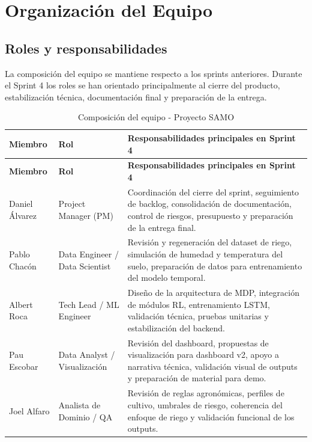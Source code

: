 \documentclass[11pt,a4paper]{article}
\begin{document}
\newpage

\section{Organización del Equipo}

\subsection{Roles y responsabilidades}

La composición del equipo se mantiene respecto a los sprints anteriores. Durante el Sprint 4 los roles se han orientado principalmente al cierre del producto, estabilización técnica, documentación final y preparación de la entrega.

\begin{longtable}{p{}p{}p{}}
\caption{Composición del equipo - Proyecto SAMO}\\
\toprule
\textbf{Miembro} & \textbf{Rol} & \textbf{Responsabilidades principales en Sprint 4} \\
\midrule
\endfirsthead
\toprule
\textbf{Miembro} & \textbf{Rol} & \textbf{Responsabilidades principales en Sprint 4} \\
\midrule
\endhead
Daniel Álvarez & Project Manager (PM) & Coordinación del cierre del sprint, seguimiento de backlog, consolidación de documentación, control de riesgos, presupuesto y preparación de la entrega final. \\
\addlinespace
Pablo Chacón & Data Engineer / Data Scientist & Revisión y regeneración del dataset de riego, simulación de humedad y temperatura del suelo, preparación de datos para entrenamiento del modelo temporal. \\
\addlinespace
Albert Roca & Tech Lead / ML Engineer & Diseño de la arquitectura de MDP, integración de módulos RL, entrenamiento LSTM, validación técnica, pruebas unitarias y estabilización del backend. \\
\addlinespace
Pau Escobar & Data Analyst / Visualización & Revisión del dashboard, propuestas de visualización para dashboard v2, apoyo a narrativa técnica, validación visual de outputs y preparación de material para demo. \\
\addlinespace
Joel Alfaro & Analista de Dominio / QA & Revisión de reglas agronómicas, perfiles de cultivo, umbrales de riesgo, coherencia del enfoque de riego y validación funcional de los outputs. \\
\bottomrule
\end{longtable}
\end{document}
